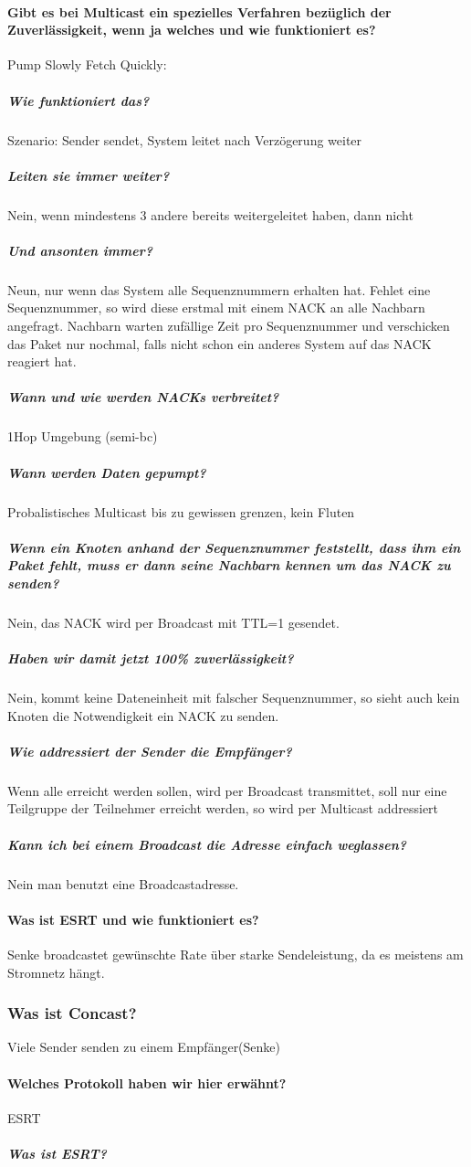 		\paragraph{Gibt es bei Multicast ein spezielles Verfahren bezüglich der Zuverlässigkeit, wenn ja welches und wie funktioniert es?}
			Pump Slowly Fetch Quickly: %
			\subparagraph{Wie funktioniert das?}
			Szenario: Sender sendet, System leitet nach Verzögerung weiter
			\subparagraph{Leiten sie immer weiter?}
			Nein, wenn mindestens 3 andere bereits weitergeleitet haben, dann nicht
			\subparagraph{Und ansonten immer?}
			Neun, nur wenn das System alle Sequenznummern erhalten hat. Fehlet eine Sequenznummer, so wird diese erstmal mit einem NACK an alle Nachbarn angefragt. Nachbarn warten zufällige Zeit pro Sequenznummer und verschicken das Paket nur nochmal, falls nicht schon ein anderes System auf das NACK reagiert hat.
			\subparagraph{Wann und wie werden NACKs verbreitet?} 1Hop Umgebung (semi-bc)
			\subparagraph{Wann werden Daten gepumpt?} Probalistisches Multicast bis zu gewissen grenzen, kein Fluten
			\subparagraph{Wenn ein Knoten anhand der Sequenznummer feststellt, dass ihm ein Paket fehlt, muss er dann seine Nachbarn kennen um das NACK zu senden?}
			Nein, das NACK wird per Broadcast mit TTL=1 gesendet.
			\subparagraph{Haben wir damit jetzt 100\% zuverlässigkeit?}
			Nein, kommt keine Dateneinheit mit falscher Sequenznummer, so sieht auch kein Knoten die Notwendigkeit ein NACK zu senden.
			\subparagraph{Wie addressiert der Sender die Empfänger?}
			Wenn alle erreicht werden sollen, wird per Broadcast transmittet, soll nur eine Teilgruppe der Teilnehmer erreicht werden, so wird per Multicast addressiert %
			\subparagraph{Kann ich bei einem Broadcast die Adresse einfach weglassen?}
			Nein man benutzt eine Broadcastadresse.
			
		\paragraph{Was ist ESRT und wie funktioniert es?}
		Senke broadcastet gewünschte Rate über starke Sendeleistung, da es meistens am Stromnetz hängt.
			
		
		\subsubsection{Was ist Concast?}
		Viele Sender senden zu einem Empfänger(Senke)
		\paragraph{Welches Protokoll haben wir hier erwähnt?}
			ESRT 
			\subparagraph{Was ist ESRT?}
			
